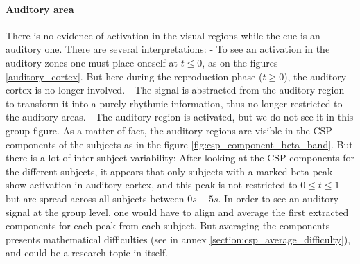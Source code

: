 
\paragraph{Auditory area}

There is no evidence of activation in the visual regions while the cue is an auditory one. There are several interpretations:
- To see an activation in the auditory zones one must place oneself at $t \leq 0$, as on the figures \ref{auditory_cortex}. But here during the reproduction phase ($t \geq 0$), the auditory cortex is no longer involved.
- The signal is abstracted from the auditory region to transform it into a purely rhythmic information, thus no longer restricted to the auditory areas.
- The auditory region is activated, but we do not see it in this group figure. As a matter of fact, the auditory regions are visible in the CSP components of the subjects as in the figure \ref{fig:csp_component_beta_band}. But there is a lot of inter-subject variability: After looking at the CSP components for the different subjects, it appears that only subjects with a marked beta peak show activation in auditory cortex, and this peak is not restricted to $0 \leq t \leq 1$ but are spread across all subjects between $0s - 5s$. In order to see an auditory signal at the group level, one would have to align and average the first extracted components for each peak from each subject. But averaging the components presents mathematical difficulties (see in annex \ref{section:csp_average_difficulty}), and could be a research topic in itself.



